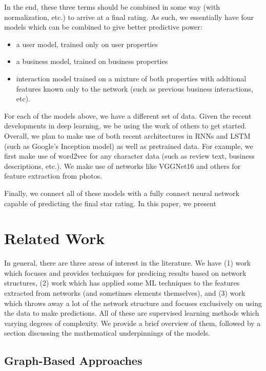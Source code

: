 \documentclass[letterpaper, 11 pt, conference]{ieeeconf}  %
\begin{document}
In the end, these three terms should be combined in some way (with normalization, etc.) to arrive at a final rating. As such, we essentially have four models which can be combined to give better predictive power:

\begin{itemize}
\item a user model, trained only on user properties
\item a business model, trained on business properties
\item interaction model trained on a mixture of both properties with addtional features known only to the network (such as previous business interactions, etc).
\end{itemize}

For each of the models above, we have a different set of data. Given the recent developments in deep learning, we be using the work of others to get started. Overall, we plan to make use of both recent architectures in RNNs and LSTM (such as Google's Inception model) as well as pretrained data. For example, we first make use of word2vec \cite{DBLP:journals/corr/abs-1301-3781} for any character data (such as review text, business descriptions, etc.). We make use of networks like VGGNet16 \cite{DBLP:journals/corr/SimonyanZ14a} and others for feature extraction from photos.

Finally, we connect all of these models with a fully connect neural network capable of predicting the final star rating. In this paper, we present 

\section{Related Work}
In general, there are three areas of interest in the literature. We have (1) work which focuses and provides techniques for predicing results based on network structures, (2) work which has applied some ML techniques to the features extracted from networks (and sometimes elements themselves), and (3) work which throws away a lot of the network structure and focuses exclusively on using the data to make predictions. All of these are supervised learning methods which varying degrees of complexity. We provide a brief overview of them, followed by a section discussing the mathematical underpinnings of the models.

\subsection{Graph-Based Approaches}
\end{document}
